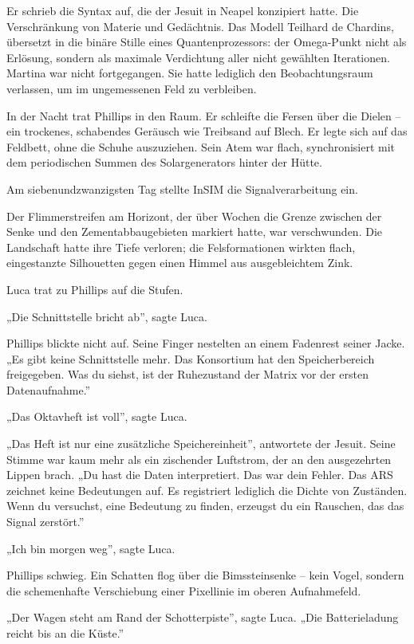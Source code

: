 \documentclass[
  ngerman,
]{article}
\begin{document}
Er schrieb die Syntax auf, die der Jesuit in Neapel konzipiert hatte.
Die Verschränkung von Materie und Gedächtnis. Das Modell Teilhard de
Chardins, übersetzt in die binäre Stille eines Quantenprozessors: der
Omega-Punkt nicht als Erlösung, sondern als maximale Verdichtung aller
nicht gewählten Iterationen. Martina war nicht fortgegangen. Sie hatte
lediglich den Beobachtungsraum verlassen, um im ungemessenen Feld zu
verbleiben.

In der Nacht trat Phillips in den Raum. Er schleifte die Fersen über die
Dielen -- ein trockenes, schabendes Geräusch wie Treibsand auf Blech. Er
legte sich auf das Feldbett, ohne die Schuhe auszuziehen. Sein Atem war
flach, synchronisiert mit dem periodischen Summen des Solargenerators
hinter der Hütte.

Am siebenundzwanzigsten Tag stellte InSIM die Signalverarbeitung ein.

Der Flimmerstreifen am Horizont, der über Wochen die Grenze zwischen der
Senke und den Zementabbaugebieten markiert hatte, war verschwunden. Die
Landschaft hatte ihre Tiefe verloren; die Felsformationen wirkten flach,
eingestanzte Silhouetten gegen einen Himmel aus ausgebleichtem Zink.

Luca trat zu Phillips auf die Stufen.

„Die Schnittstelle bricht ab'', sagte Luca.

Phillips blickte nicht auf. Seine Finger nestelten an einem Fadenrest
seiner Jacke. „Es gibt keine Schnittstelle mehr. Das Konsortium hat den
Speicherbereich freigegeben. Was du siehst, ist der Ruhezustand der
Matrix vor der ersten Datenaufnahme.''

„Das Oktavheft ist voll'', sagte Luca.

„Das Heft ist nur eine zusätzliche Speichereinheit'', antwortete der
Jesuit. Seine Stimme war kaum mehr als ein zischender Luftstrom, der an
den ausgezehrten Lippen brach. „Du hast die Daten interpretiert. Das war
dein Fehler. Das ARS zeichnet keine Bedeutungen auf. Es registriert
lediglich die Dichte von Zuständen. Wenn du versuchst, eine Bedeutung zu
finden, erzeugst du ein Rauschen, das das Signal zerstört.''

„Ich bin morgen weg'', sagte Luca.

Phillips schwieg. Ein Schatten flog über die Bimssteinsenke -- kein
Vogel, sondern die schemenhafte Verschiebung einer Pixellinie im oberen
Aufnahmefeld.

„Der Wagen steht am Rand der Schotterpiste'', sagte Luca. „Die
Batterieladung reicht bis an die Küste.''
\end{document}
